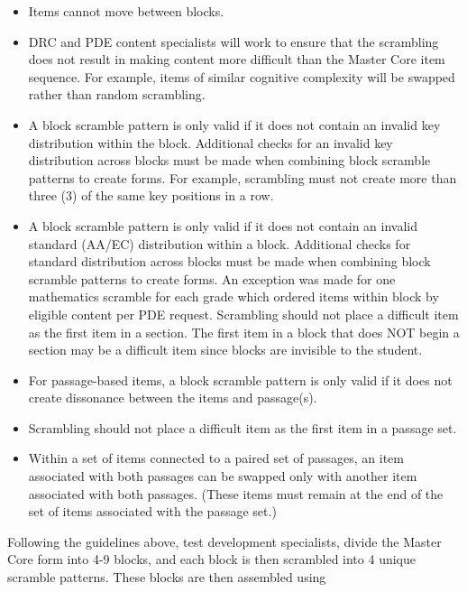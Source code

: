 \documentclass[11pt]{article}
\begin{document}
\begin{addmargin}[1em]{2em}
  \begin{itemize}
  \item Items cannot move between blocks.
  \item DRC and PDE content specialists will work to ensure that the
    scrambling does not result in making content more difficult than
    the Master Core item sequence. For example, items of similar
    cognitive complexity will be swapped rather than random
    scrambling.
  \item A block scramble pattern is only valid if it does not contain
    an invalid key distribution within the block. Additional checks
    for an invalid key distribution across blocks must be made when
    combining block scramble patterns to create forms. For example,
    scrambling must not create more than three (3) of the same key
    positions in a row.
  \item A block scramble pattern is only valid if it does not contain
    an invalid standard (AA/EC) distribution within a
    block. Additional checks for standard distribution across blocks
    must be made when combining block scramble patterns to create
    forms.  An exception was made for one mathematics scramble for
    each grade which ordered items within block by eligible content
    per PDE request.  Scrambling should not place a difficult item as
    the first item in a section. The first item in a block that does
    NOT begin a section may be a difficult item since blocks are
    invisible to the student.
  \item For passage-based items, a block scramble pattern is only
    valid if it does not create dissonance between the items and
    passage(s).
  \item Scrambling should not place a difficult item as the first item
    in a passage set.
  \item Within a set of items connected to a paired set of passages,
    an item associated with both passages can be swapped only with
    another item associated with both passages.  (These items must
    remain at the end of the set of items associated with the passage
    set.)
  \end{itemize}
\end{addmargin}
\par
Following the guidelines above, test development specialists, divide
the Master Core form into 4-9 blocks, and each block is then scrambled
into 4 unique scramble patterns. These blocks are then assembled using
\end{document}
